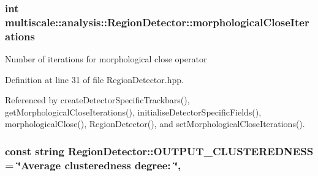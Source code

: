 \hypertarget{classmultiscale_1_1analysis_1_1RegionDetector_a700a2f299d7c56fbd1fdbec68092f23a}{
\subsubsection[{morphological\-Close\-Iterations}]{\setlength{\rightskip}{0pt plus 5cm}int multiscale\-::analysis\-::\-Region\-Detector\-::morphological\-Close\-Iterations\hspace{0.3cm}{\ttfamily [private]}}}\label{classmultiscale_1_1analysis_1_1RegionDetector_a700a2f299d7c56fbd1fdbec68092f23a}
Number of iterations for morphological close operator 

Definition at line 31 of file Region\-Detector.\-hpp.



Referenced by create\-Detector\-Specific\-Trackbars(), get\-Morphological\-Close\-Iterations(), initialise\-Detector\-Specific\-Fields(), morphological\-Close(), Region\-Detector(), and set\-Morphological\-Close\-Iterations().

\hypertarget{classmultiscale_1_1analysis_1_1RegionDetector_a7eeefa86e8c94ee7c89b3e17fb94d931}{
\subsubsection[{O\-U\-T\-P\-U\-T\-\_\-\-C\-L\-U\-S\-T\-E\-R\-E\-D\-N\-E\-S\-S}]{\setlength{\rightskip}{0pt plus 5cm}const string Region\-Detector\-::\-O\-U\-T\-P\-U\-T\-\_\-\-C\-L\-U\-S\-T\-E\-R\-E\-D\-N\-E\-S\-S = \char`\"{}Average clusteredness degree\-: \char`\"{}\hspace{0.3cm}{\ttfamily [static]}, {\ttfamily [private]}}}\label{classmultiscale_1_1analysis_1_1RegionDetector_a7eeefa86e8c94ee7c89b3e17fb94d931}


